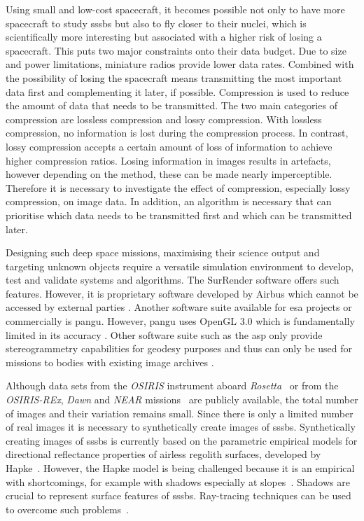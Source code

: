 Using small and low-cost spacecraft, it becomes possible not only to have more spacecraft to study \glspl{sssb} but also to fly closer to their nuclei, which is scientifically more interesting but associated with a higher risk of losing a spacecraft. This puts two major constraints onto their data budget. Due to size and power limitations, miniature radios provide lower data rates. Combined with the possibility of losing the spacecraft means transmitting the most important data first and complementing it later, if possible. Compression is used to reduce the amount of data that needs to be transmitted. The two main categories of compression are lossless compression and lossy compression. With lossless compression, no information is lost during the compression process. In contrast, lossy compression accepts a certain amount of loss of information to achieve higher compression ratios. Losing information in images results in artefacts, however depending on the method, these can be made nearly imperceptible. Therefore it is necessary to investigate the effect of compression, especially lossy compression, on image data. In addition, an algorithm is necessary that can prioritise which data needs to be transmitted first and which can be transmitted later.

Designing such deep space missions, maximising their science output and targeting unknown objects require a versatile simulation environment to develop, test and validate systems and algorithms. The SurRender software offers such features. However, it is proprietary software developed by Airbus which cannot be accessed by external parties \cite{Brochard2018ScientificSoftware}. Another software suite available for \gls{esa} projects or commercially is \gls{pangu}. However, \gls{pangu} uses OpenGL 3.0 which is fundamentally limited in its accuracy \cite{Martin2019PlanetaryPANGU}. Other software suite such as the \gls{asp} only provide stereogrammetry capabilities for geodesy purposes and thus can only be used for missions to bodies with existing image archives \cite{Beyer2018TheData}.

Although data sets from the \textit{OSIRIS} instrument aboard \textit{Rosetta}~\cite{osirisArchive} or from the \textit{OSIRIS-REx}, \textit{Dawn} and \textit{NEAR} missions~\cite{palmer2014small} are publicly available, the total number of images and their variation remains small. Since there is only a limited number of real images it is necessary to synthetically create images of \glspl{sssb}. Synthetically creating images of \gls{sssb}s is currently based on the parametric empirical models for directional reflectance properties of airless regolith surfaces, developed by Hapke~\cite{Hapke1981BidirectionalTheory, hapke1981bidirectional2, Hapke1984BidirectionalRoughness, Hapke1986BidirectionalEffect, Hapke2002BidirectionalScattering, Hapke2008BidirectionalPorosity, Hapke2012Bidirectional7}. However, the Hapke model is being challenged because it is an empirical with shortcomings, for example with shadows especially at slopes~\cite{shkuratov2012critical}. Shadows are crucial  to represent surface features of \glspl{sssb}. Ray-tracing techniques can be used to overcome such problems~\cite{shkuratov2012critical, lafortune1996mathematical}.

